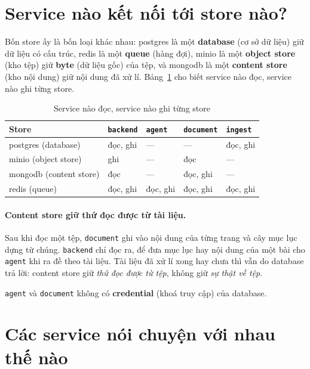 \section{Service nào kết nối tới store nào?}

Bốn store ấy là bốn loại khác nhau: postgres là một \textbf{database} (cơ sở dữ liệu) giữ dữ liệu
có cấu trúc, redis là một \textbf{queue} (hàng đợi), minio là một \textbf{object store}
(kho tệp) giữ \textbf{byte} (dữ liệu gốc) của tệp, và mongodb là một \textbf{content store} (kho
nội dung) giữ nội dung đã xử lí. Bảng~\ref{tab:service-store} cho biết service nào đọc, service
nào ghi từng store.

\begin{table}[htb]
\centering
\caption[Service nào đọc, ghi store nào]{Service nào đọc, service nào ghi từng store}
\label{tab:service-store}
\begin{tabular}{@{}lllll@{}}
\toprule
\textbf{Store} & \texttt{backend} & \texttt{agent} & \texttt{document} & \texttt{ingest} \\
\midrule
postgres (database) & đọc, ghi & --- & --- & đọc, ghi \\
\addlinespace
minio (object store) & ghi & --- & đọc & --- \\
\addlinespace
mongodb (content store) & đọc & --- & đọc, ghi & --- \\
\addlinespace
redis (queue) & đọc, ghi & đọc, ghi & đọc, ghi & đọc, ghi \\
\bottomrule
\end{tabular}
\end{table}

\paragraph{Content store giữ thứ đọc được từ tài liệu.} Sau khi đọc một tệp, \texttt{document} ghi
vào nội dung của từng trang và cây mục lục dựng từ chúng. \texttt{backend} chỉ đọc ra, để đưa mục
lục hay nội dung của một bài cho \texttt{agent} khi ra đề theo tài liệu. Tài liệu đã xử lí xong hay chưa
thì vẫn do database trả lời: content store giữ \emph{thứ đọc được từ tệp}, không giữ \emph{sự thật
về tệp}.

\texttt{agent} và \texttt{document} không có \textbf{credential} (khoá truy cập) của database.

\section{Các service nói chuyện với nhau thế nào}
\label{sec:noi-chuyen}

